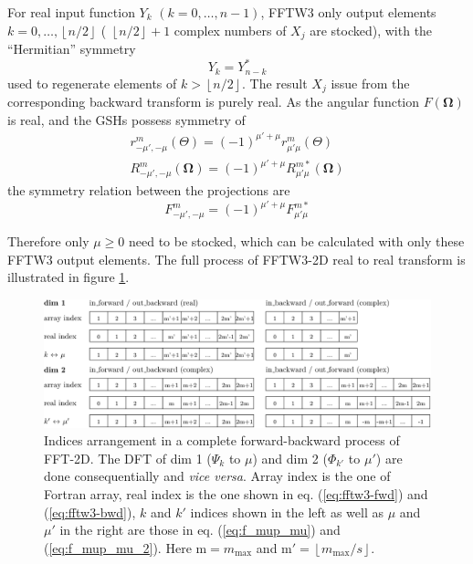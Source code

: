 For real input function $Y_{k}$ $(k=0,\ldots,n-1)$, FFTW3 only output
elements $k=0,\ldots,\left\lfloor n/2\right\rfloor $ ( $\left\lfloor n/2\right\rfloor +1$
complex numbers of $X_{j}$ are stocked), with the “Hermitian” symmetry
\begin{equation}
Y_{k}=Y_{n-k}^{*}\label{eq:yk_conjg}
\end{equation}
used to regenerate elements of $k>\left\lfloor n/2\right\rfloor $.
The result $X_{j}$ issue from the corresponding backward transform
is purely real. As the angular function $F(\mathbf{\Omega})$ is real,
and the GSHs possess symmetry \citep{Gray-Gubbins,Messiah} of
\begin{equation}
\begin{array}{c}
r_{-\mu',-\mu}^{m}(\Theta)=\left(-1\right)^{\mu'+\mu}r_{\mu'\mu}^{m}(\Theta)\\
R_{-\mu',-\mu}^{m}(\mathbf{\Omega})=\left(-1\right)^{\mu'+\mu}R_{\mu'\mu}^{m*}(\mathbf{\Omega})
\end{array}
\end{equation}
the symmetry relation between the projections are
\begin{equation}
F_{-\mu',-\mu}^{m}=\left(-1\right)^{\mu'+\mu}F_{\mu'\mu}^{m*}\label{eq:symm_f_m_mup_mu}
\end{equation}


Therefore only $\mu\geq0$ need to be stocked, which can be calculated
with only these FFTW3 output elements. The full process of FFTW3-2D
real to real transform is illustrated in figure \ref{fig:FFTW3-2D-indices}.

\begin{figure}[h]
\centering{}%
\begin{minipage}[t]{1\textwidth}%
\begin{center}
\includegraphics[width=1\textwidth]{_figure/fftw3_indices}
\par\end{center}

\caption[Indices arrangement in a complete forward-backward process of FFT-2D]{Indices arrangement in a complete forward-backward process of FFT-2D.
The DFT of dim 1 ($\Psi_{k}$ to $\mu$) and dim 2 ($\Phi_{k'}$ to
$\mu'$) are done consequentially and \emph{vice versa}. Array index
is the one of Fortran array, real index is the one shown in eq. (\ref{eq:fftw3-fwd})
and (\ref{eq:fftw3-bwd}), $k$ and $k'$ indices shown in the left
as well as $\mu$ and $\mu'$ in the right are those in eq. (\ref{eq:f_mup_mu})
and (\ref{eq:f_mup_mu_2}). Here $\mathrm{m}=m_{\mathrm{max}}$ and
$\mathrm{m}'=\left\lfloor m_{\mathrm{max}}/s\right\rfloor $. \label{fig:FFTW3-2D-indices}}
%
\end{minipage}
\end{figure}


